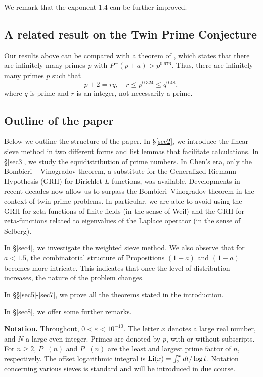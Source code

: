 \documentclass[12pt, a4paper]{amsart}
\def\Li{\hbox{{\rm Li}}}
\def\le{\leqslant}
\def\ge{\geqslant}
\theoremstyle{plain}
\theoremstyle{remark}
\numberwithin{equation}{section}
\begin{document}
We remark that the exponent \(1.4\) can be further improved. 

\subsection{A related result on the Twin Prime Conjecture}
Our results above can be compared with a theorem of \cite{BH96}, which states that there are infinitely many 
primes \(p\) with \(P^{+}(p+a) > p^{0.676}\). Thus, there are infinitely many primes \(p\) such that 
\[
p+2 = rq, \quad r \le p^{0.324} \le q^{0.48},
\]
where \(q\) is prime and \(r\) is an integer, not necessarily a prime.
	
\subsection{Outline of the paper}

Below we outline the structure of the paper. 
In \S \ref{sec2}, we introduce the linear sieve method in two different forms and list lemmas that facilitate calculations.
In \S \ref{sec3}, we study the equidistribution of prime numbers. In Chen’s era, only the Bombieri -- Vinogradov theorem, 
a substitute for the Generalized Riemann Hypothesis (GRH) for Dirichlet \(L\)-functions, 
was available. Developments in recent decades now allow us to 
surpass the Bombieri--Vinogradov theorem in the context of twin prime problems. In particular, we are 
able to avoid using the GRH for zeta-functions of finite fields (in the sense of Weil) and the GRH 
for zeta-functions related to eigenvalues of the Laplace operator (in the sense of Selberg).

In \S \ref{sec4}, we investigate the weighted sieve method. We also observe that for \(a < 1.5\), the combinatorial structure of 
Propositions \((1+a)\) and \((1-a)\) becomes more intricate. This indicates that once the level of distribution increases, the nature of the problem changes.

In \S\S \ref{sec5}-\ref{sec7}, we prove all the theorems stated in the introduction.

In \S \ref{sec8}, we offer some further remarks.

\medskip

\noindent
\textbf{Notation.}  
Throughout, \(0<\varepsilon<10^{-10}\). The letter \(x\) denotes a large real number, and \(N\) a large even integer.  
Primes are denoted by \(p\), with or without subscripts.  
For \(n \ge 2\), \(P^{-}(n)\) and \(P^{+}(n)\) are the least and largest prime factor of \(n\), respectively.   
The offset logarithmic integral is 
\(\Li(x)=\int_{2}^{x} dt/\log t\).  
Notation concerning various sieves is standard and will be introduced in due course.
\end{document}
